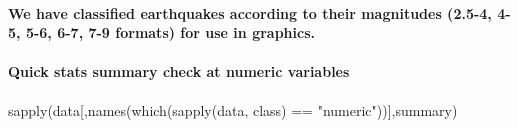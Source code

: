 \documentclass[
]{article}
\newenvironment{Shaded}{\begin{snugshade}}{\end{snugshade}}
\newcommand{\AttributeTok}[1]{\textcolor[rgb]{0.77,0.63,0.00}{#1}}
\newcommand{\CommentTok}[1]{\textcolor[rgb]{0.56,0.35,0.01}{\textit{#1}}}
\newcommand{\DecValTok}[1]{\textcolor[rgb]{0.00,0.00,0.81}{#1}}
\newcommand{\FloatTok}[1]{\textcolor[rgb]{0.00,0.00,0.81}{#1}}
\newcommand{\FunctionTok}[1]{\textcolor[rgb]{0.00,0.00,0.00}{#1}}
\newcommand{\NormalTok}[1]{#1}
\newcommand{\OtherTok}[1]{\textcolor[rgb]{0.56,0.35,0.01}{#1}}
\newcommand{\SpecialCharTok}[1]{\textcolor[rgb]{0.00,0.00,0.00}{#1}}
\newcommand{\StringTok}[1]{\textcolor[rgb]{0.31,0.60,0.02}{#1}}
\begin{document}
\hypertarget{we-have-classified-earthquakes-according-to-their-magnitudes-2.5-4-4-5-5-6-6-7-7-9-formats-for-use-in-graphics.}{%
\paragraph{We have classified earthquakes according to their magnitudes
(2.5-4, 4-5, 5-6, 6-7, 7-9 formats) for use in
graphics.}\label{we-have-classified-earthquakes-according-to-their-magnitudes-2.5-4-4-5-5-6-6-7-7-9-formats-for-use-in-graphics.}}

\begin{Shaded}
\end{Shaded}

\hypertarget{quick-stats-summary-check-at-numeric-variables}{%
\paragraph{Quick stats summary check at numeric
variables}\label{quick-stats-summary-check-at-numeric-variables}}

\begin{Shaded}
\begin{Highlighting}[]
\FunctionTok{sapply}\NormalTok{(data[,}\FunctionTok{names}\NormalTok{(}\FunctionTok{which}\NormalTok{(}\FunctionTok{sapply}\NormalTok{(data, class) }\SpecialCharTok{==} \StringTok{"numeric"}\NormalTok{))],summary)}
\end{Highlighting}
\end{Shaded}
\end{document}
